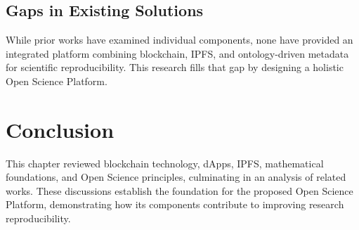 \documentclass{article}
\begin{document}
\subsection{Gaps in Existing Solutions}
While prior works have examined individual components, none have provided an integrated platform combining blockchain, IPFS, and ontology-driven metadata for scientific reproducibility. This research fills that gap by designing a holistic Open Science Platform.

\section{Conclusion}

This chapter reviewed blockchain technology, dApps, IPFS, mathematical foundations, and Open Science principles, culminating in an analysis of related works. These discussions establish the foundation for the proposed Open Science Platform, demonstrating how its components contribute to improving research reproducibility.





\end{document}
